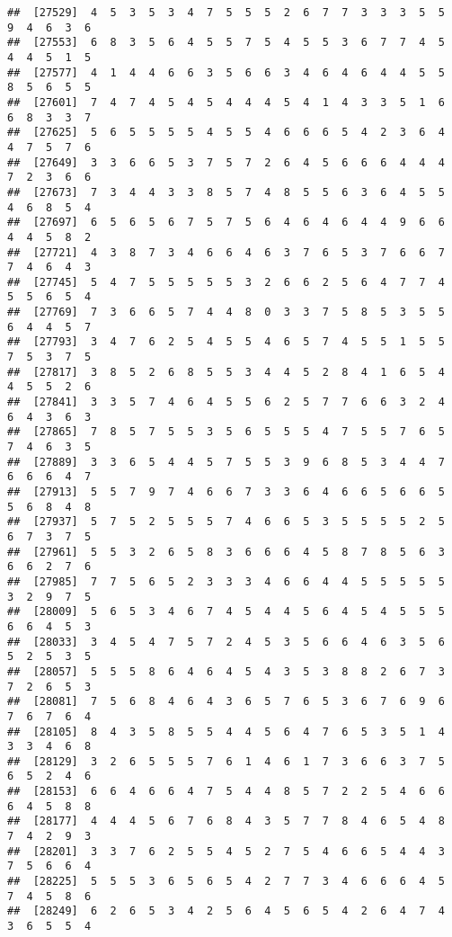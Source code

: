 \documentclass[
]{book}
\begin{document}
\begin{verbatim}
##  [27529]  4  5  3  5  3  4  7  5  5  5  2  6  7  7  3  3  3  5  5  9  4  6  3  6
##  [27553]  6  8  3  5  6  4  5  5  7  5  4  5  5  3  6  7  7  4  5  4  4  5  1  5
##  [27577]  4  1  4  4  6  6  3  5  6  6  3  4  6  4  6  4  4  5  5  8  5  6  5  5
##  [27601]  7  4  7  4  5  4  5  4  4  4  5  4  1  4  3  3  5  1  6  6  8  3  3  7
##  [27625]  5  6  5  5  5  5  4  5  5  4  6  6  6  5  4  2  3  6  4  4  7  5  7  6
##  [27649]  3  3  6  6  5  3  7  5  7  2  6  4  5  6  6  6  4  4  4  7  2  3  6  6
##  [27673]  7  3  4  4  3  3  8  5  7  4  8  5  5  6  3  6  4  5  5  4  6  8  5  4
##  [27697]  6  5  6  5  6  7  5  7  5  6  4  6  4  6  4  4  9  6  6  4  4  5  8  2
##  [27721]  4  3  8  7  3  4  6  6  4  6  3  7  6  5  3  7  6  6  7  7  4  6  4  3
##  [27745]  5  4  7  5  5  5  5  5  3  2  6  6  2  5  6  4  7  7  4  5  5  6  5  4
##  [27769]  7  3  6  6  5  7  4  4  8  0  3  3  7  5  8  5  3  5  5  6  4  4  5  7
##  [27793]  3  4  7  6  2  5  4  5  5  4  6  5  7  4  5  5  1  5  5  7  5  3  7  5
##  [27817]  3  8  5  2  6  8  5  5  3  4  4  5  2  8  4  1  6  5  4  4  5  5  2  6
##  [27841]  3  3  5  7  4  6  4  5  5  6  2  5  7  7  6  6  3  2  4  6  4  3  6  3
##  [27865]  7  8  5  7  5  5  3  5  6  5  5  5  4  7  5  5  7  6  5  7  4  6  3  5
##  [27889]  3  3  6  5  4  4  5  7  5  5  3  9  6  8  5  3  4  4  7  6  6  6  4  7
##  [27913]  5  5  7  9  7  4  6  6  7  3  3  6  4  6  6  5  6  6  5  5  6  8  4  8
##  [27937]  5  7  5  2  5  5  5  7  4  6  6  5  3  5  5  5  5  2  5  6  7  3  7  5
##  [27961]  5  5  3  2  6  5  8  3  6  6  6  4  5  8  7  8  5  6  3  6  6  2  7  6
##  [27985]  7  7  5  6  5  2  3  3  3  4  6  6  4  4  5  5  5  5  5  3  2  9  7  5
##  [28009]  5  6  5  3  4  6  7  4  5  4  4  5  6  4  5  4  5  5  5  6  6  4  5  3
##  [28033]  3  4  5  4  7  5  7  2  4  5  3  5  6  6  4  6  3  5  6  5  2  5  3  5
##  [28057]  5  5  5  8  6  4  6  4  5  4  3  5  3  8  8  2  6  7  3  7  2  6  5  3
##  [28081]  7  5  6  8  4  6  4  3  6  5  7  6  5  3  6  7  6  9  6  7  6  7  6  4
##  [28105]  8  4  3  5  8  5  5  4  4  5  6  4  7  6  5  3  5  1  4  3  3  4  6  8
##  [28129]  3  2  6  5  5  5  7  6  1  4  6  1  7  3  6  6  3  7  5  6  5  2  4  6
##  [28153]  6  6  4  6  6  4  7  5  4  4  8  5  7  2  2  5  4  6  6  6  4  5  8  8
##  [28177]  4  4  4  5  6  7  6  8  4  3  5  7  7  8  4  6  5  4  8  7  4  2  9  3
##  [28201]  3  3  7  6  2  5  5  4  5  2  7  5  4  6  6  5  4  4  3  7  5  6  6  4
##  [28225]  5  5  5  3  6  5  6  5  4  2  7  7  3  4  6  6  6  4  5  7  4  5  8  6
##  [28249]  6  2  6  5  3  4  2  5  6  4  5  6  5  4  2  6  4  7  4  3  6  5  5  4

\end{verbatim}
\end{document}
